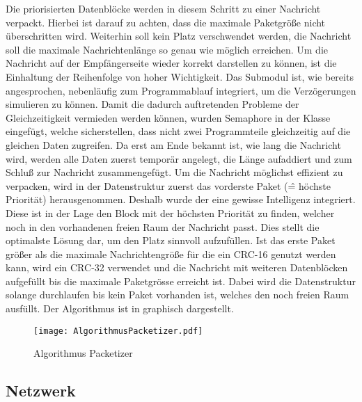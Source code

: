 Die priorisierten Datenbl{\"o}cke werden in diesem Schritt zu einer Nachricht
verpackt. Hierbei ist darauf zu achten, dass die maximale Paketgr{\"o}{\ss}e
nicht {\"u}berschritten wird. Weiterhin soll kein Platz verschwendet werden, \dahe
die Nachricht soll die maximale Nachrichtenl{\"a}nge so genau wie m{\"o}glich erreichen.
Um die Nachricht auf der Empf{\"a}ngerseite wieder korrekt darstellen zu k{\"o}nnen, ist
die Einhaltung der Reihenfolge von hoher Wichtigkeit. \newline
Das Submodul ist, wie bereits angesprochen, nebenl{\"a}ufig zum Programmablauf
integriert, um die Verz{\"o}gerungen simulieren zu k{\"o}nnen. Damit die
dadurch auftretenden Probleme der Gleichzeitigkeit vermieden werden k{\"o}nnen,
wurden Semaphore in der Klasse 
eingef{\"u}gt, welche sicherstellen, dass nicht zwei Programmteile gleichzeitig auf
die gleichen Daten zugreifen. Da erst am Ende bekannt ist, wie lang die
Nachricht wird, werden alle Daten zuerst tempor{\"a}r angelegt, die L{\"a}nge aufaddiert
und zum Schlu{\ss} zur Nachricht zusammengef{\"u}gt.
Um die Nachricht m{\"o}glichst effizient zu verpacken, wird in der
Datenstruktur  zuerst das vorderste Paket
(\^= h{\"o}chste Priorit{\"a}t) herausgenommen. Deshalb wurde der
 eine gewisse Intelligenz integriert.
Diese ist in der Lage den Block mit der h{\"o}chsten Priorit{\"a}t zu finden, welcher
noch in den vorhandenen freien Raum der Nachricht passt. Dies stellt die
optimalste L{\"o}sung dar, um den Platz sinnvoll aufzuf{\"u}llen. \newline 
Ist das erste Paket gr{\"o}{\ss}er als die maximale Nachrichtengr{\"o}{\ss}e f{\"u}r die ein CRC-16
genutzt werden kann, wird ein CRC-32 verwendet und die Nachricht mit weiteren
Datenbl{\"o}cken aufgef{\"u}llt bis die maximale Paketgr{\"o}sse erreicht ist. Dabei wird
die Datenstruktur  solange
durchlaufen bis kein Paket vorhanden ist, welches den noch freien Raum
ausf{\"u}llt. \newline 
Der Algorithmus ist in  graphisch dargestellt.

\begin{figure}[H]
\centering
\texttt{[image: AlgorithmusPacketizer.pdf]}
\caption{Algorithmus Packetizer}
\label{fig:AlgorithmusPacketizer}
\end{figure}

\subsection{Netzwerk}

